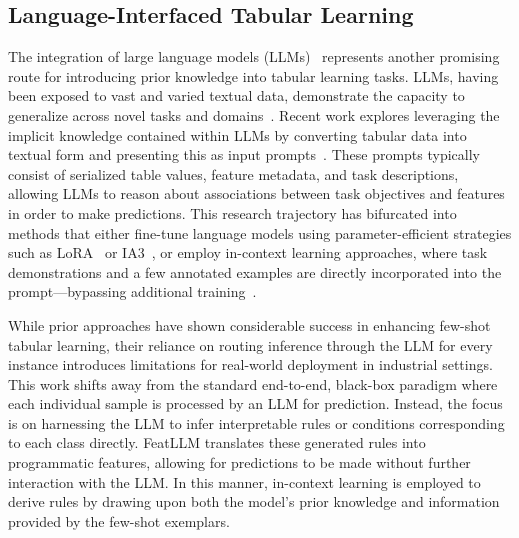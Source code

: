 \subsection{Language-Interfaced Tabular Learning} 

The integration of large language models (LLMs)~\cite{anil2023palm,openai2023gpt4} represents another promising route for introducing prior knowledge into tabular learning tasks. LLMs, having been exposed to vast and varied textual data, demonstrate the capacity to generalize across novel tasks and domains~\cite{brown2020language}. Recent work explores leveraging the implicit knowledge contained within LLMs by converting tabular data into textual form and presenting this as input prompts~\cite{dinh2022lift,hegselmann2023tabllm,wang2023anypredict}. These prompts typically consist of serialized table values, feature metadata, and task descriptions, allowing LLMs to reason about associations between task objectives and features in order to make predictions. This research trajectory has bifurcated into methods that either fine-tune language models using parameter-efficient strategies such as LoRA~\cite{hu2021lora} or IA3~\cite{liu2022few}, or employ in-context learning approaches, where task demonstrations and a few annotated examples are directly incorporated into the prompt—bypassing additional training~\cite{dinh2022lift,hegselmann2023tabllm,nam2023semi,slack2023tablet}.

While prior approaches have shown considerable success in enhancing few-shot tabular learning, their reliance on routing inference through the LLM for every instance introduces limitations for real-world deployment in industrial settings. This work shifts away from the standard end-to-end, black-box paradigm where each individual sample is processed by an LLM for prediction. Instead, the focus is on harnessing the LLM to infer interpretable rules or conditions corresponding to each class directly. \textsf{FeatLLM} translates these generated rules into programmatic features, allowing for predictions to be made without further interaction with the LLM. In this manner, in-context learning is employed to derive rules by drawing upon both the model’s prior knowledge and information provided by the few-shot exemplars.

